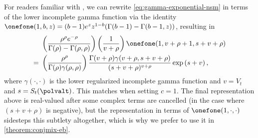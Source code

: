 \begin{remark}\label{section:onefone-vs-lowerincgamma}
For readers familiar with \citet[Proposition 9]{howard2018uniform}, we can rewrite \eqref{eq:gamma-exponential-nsm} in terms of the lower incomplete gamma function via the identity
$\onefone(1, b, z) = (b-1) e^z z^{1-b} (\Gamma(b-1)-\Gamma(b-1,z))$, resulting in \begin{align*}
& \left(\frac{\rho^\rho e^{-\rho}}{\Gamma(\rho) - \Gamma(\rho, \rho)}\right) \left(\frac{1}{v + \rho}\right) \onefone(1, v + \rho + 1, s + v + \rho) \\
 = \ &\left(\frac{\rho^\rho}{\Gamma(\rho) \gamma(\rho, \rho)}\right)  \frac{\Gamma(v + \rho) \gamma(v + \rho, s + v + \rho)}{(s + v + \rho)^{v + \rho}} \exp\left(s + v\right),
\end{align*}
where $\gamma(\cdot, \cdot)$ is the lower regularized incomplete gamma function and $v = V_t$ and $s = S_t(\polvalt)$.  This matches \citet[Eq. (66)]{howard2018uniform} when setting $c = 1$. The final representation above is real-valued after some complex terms are cancelled (in the case where $(s + v + \rho)$ is negative), but the representation in terms of $\onefone(1, \cdot, \cdot)$ sidesteps this subtlety altogether, which is why we prefer to use it in \cref{theorem:conjmix-eb}.


\end{remark}


